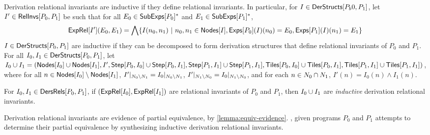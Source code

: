 Derivation relational invariants are inductive if they define
relational invariants.
%
In particular, for $I \in \mathsf{DerStructs}[ P_b0, P_1 ]$, let $I' \in
\mathsf{RelInvs}[ P_0, P_1 ]$ be such that for all $E_0 \in \mathsf{SubExps}[ P_0 ]^{*}$
and $E_1 \in \mathsf{SubExps}[ P_1 ]^{*}$,
\begin{align*}
  \exprel{I'}(E_0, E_1) = %
  \bigland \setformer{ I(n_0, n_1) }{ %
    n_0, n_1 \in \nodes{I},
    \dersexps{P_0}{I}(n_0) = E_0, \dersexps{P_1}{I}(n_1) = E_1 }
\end{align*}
%
$I \in \mathsf{DerStructs}[ P_0, P_1 ]$ are inductive if they can be decomposed
to form derivation structures that define relational invariants of
$P_0$ and $P_1$.
%
For all $I_0, I_1 \in \mathsf{DerStructs}[ P_0, P_1 ]$, let $I_0 \union I_1 =
(\nodes{I_0} \union \nodes{I_1}, I', %
\stepedges{P_0}{I_0} \union \stepedges{P_0}{I_1}, %
\stepedges{P_1}{I_1} \union \stepedges{P_1}{I_1}, %
\tilesof{P_0}{I_0} \union \tilesof{P_0}{I_1}, %
\tilesof{P_1}{I_1} \union \tilesof{P_1}{I_1})$, where %
for all $n \in \mathsf{Nodes}[ I_0 ] \setminus \mathsf{Nodes}[ I_1 ]$, 
$I'|_{N_0 \setminus N_1} = I_0|_{N_0 \setminus
  N_1}$, %
$I'|_{N_1 \setminus N_0} = I_0|_{N_1 \setminus
  N_0}$, and %
for each $n \in N_0 \cap N_1$, $I'(n) = I_0(n) \land
I_1(n)$.
%
\begin{defn}
  \label{defn:inductive-der-rels}
  For $I_0, I_1 \in \mathsf{DersRels}[ P_0, P_1 ]$, if $(\mathsf{ExpRel}[ I_0 ],
  \mathsf{ExpRel}[ I_1 ])$ are relational invariants of $P_0$ and $P_1$, then
  $I_0 \cup I_1$ are \emph{inductive} derivation relational
  invariants.
\end{defn}
%
Derivation relational invariants are evidence of partial equivalence,
by \autoref{lemma:equiv-evidence}.
%
\sys, given programs $P_0$ and $P_1$ attempts to determine their
partial equivalence by synthesizing inductive derivation relational
invariants.

